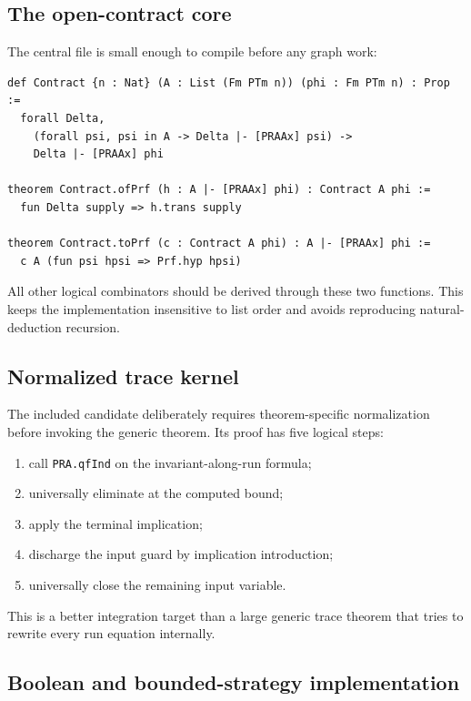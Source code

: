 \subsection{The open-contract core}

The central file is small enough to compile before any graph work:
\begin{lstlisting}
def Contract {n : Nat} (A : List (Fm PTm n)) (phi : Fm PTm n) : Prop :=
  forall Delta,
    (forall psi, psi in A -> Delta |- [PRAAx] psi) ->
    Delta |- [PRAAx] phi

theorem Contract.ofPrf (h : A |- [PRAAx] phi) : Contract A phi :=
  fun Delta supply => h.trans supply

theorem Contract.toPrf (c : Contract A phi) : A |- [PRAAx] phi :=
  c A (fun psi hpsi => Prf.hyp hpsi)
\end{lstlisting}
All other logical combinators should be derived through these two functions.  This keeps the implementation insensitive to list order and avoids reproducing natural-deduction recursion.

\subsection{Normalized trace kernel}

The included candidate deliberately requires theorem-specific normalization before invoking the generic theorem.  Its proof has five logical steps:
\begin{enumerate}
  \item call \texttt{PRA.qfInd} on the invariant-along-run formula;
  \item universally eliminate at the computed bound;
  \item apply the terminal implication;
  \item discharge the input guard by implication introduction;
  \item universally close the remaining input variable.
\end{enumerate}
This is a better integration target than a large generic trace theorem that tries to rewrite every run equation internally.

\subsection{Boolean and bounded-strategy implementation}

